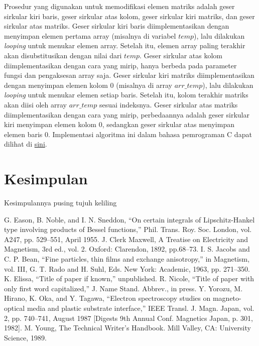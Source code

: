 \documentclass[conference]{IEEEtran}
\begin{document}
Prosedur yang digunakan untuk memodifikasi elemen matriks adalah geser sirkular kiri baris, geser sirkular atas kolom, geser sirkular kiri matriks, dan geser sirkular atas matriks.
Geser sirkular kiri baris diimplementasikan dengan menyimpan elemen pertama array (misalnya di variabel $temp$), lalu dilakukan \textit{looping} untuk menukar elemen array.
Setelah itu, elemen array paling terakhir akan disubstitusikan dengan nilai dari $temp$.
Geser sirkular atas kolom diimplementasikan dengan cara yang mirip, hanya berbeda pada parameter fungsi dan pengaksesan array saja.
Geser sirkular kiri matriks diimplementasikan dengan menyimpan elemen kolom 0 (misalnya di array $arr\_temp$), lalu dilakukan \textit{looping} untuk menukar elemen setiap baris.
Setelah itu, kolom terakhir matriks akan diisi oleh array $arr\_temp$ sesuai indeksnya.
Geser sirkular atas matriks diimplementasikan dengan cara yang mirip, 
perbedaannya adalah geser sirkular kiri menyimpan elemen kolom 0, sedangkan geser sirkular atas menyimpan elemen baris 0.
Implementasi algoritma ini dalam bahasa pemrograman C dapat dilihat di
\href{https://github.com/Fariz06/Tugas-5-PMC}{sini}.

\section{Kesimpulan}
Kesimpulannya pusing tujuh keliling

\begin{thebibliography}{00}
 G. Eason, B. Noble, and I. N. Sneddon, ``On certain integrals of Lipschitz-Hankel type involving products of Bessel functions,'' Phil. Trans. Roy. Soc. London, vol. A247, pp. 529--551, April 1955.
 J. Clerk Maxwell, A Treatise on Electricity and Magnetism, 3rd ed., vol. 2. Oxford: Clarendon, 1892, pp.68--73.
 I. S. Jacobs and C. P. Bean, ``Fine particles, thin films and exchange anisotropy,'' in Magnetism, vol. III, G. T. Rado and H. Suhl, Eds. New York: Academic, 1963, pp. 271--350.
 K. Elissa, ``Title of paper if known,'' unpublished.
 R. Nicole, ``Title of paper with only first word capitalized,'' J. Name Stand. Abbrev., in press.
 Y. Yorozu, M. Hirano, K. Oka, and Y. Tagawa, ``Electron spectroscopy studies on magneto-optical media and plastic substrate interface,'' IEEE Transl. J. Magn. Japan, vol. 2, pp. 740--741, August 1987 [Digests 9th Annual Conf. Magnetics Japan, p. 301, 1982].
 M. Young, The Technical Writer's Handbook. Mill Valley, CA: University Science, 1989.
\end{thebibliography}
\end{document}
